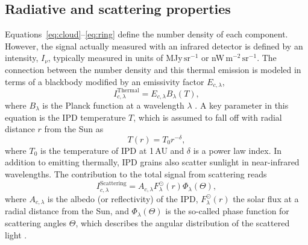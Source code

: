\documentclass[twocolumn]{aa}
\begin{document}
\subsection{Radiative and scattering properties}
Equations~\eqref{eq:cloud}--\eqref{eq:ring} define the number density
of each component. However, the signal actually measured with an
infrared detector is defined by an intensity, $I_{\nu}$, typically
measured in units of MJy$\,\mathrm{sr}^{-1}$ or
nW$\,\mathrm{m}^{-2}\,\mathrm{sr}^{-1}$. The connection between the
number density and this thermal emission is modeled in terms
of a blackbody modified by an emissivity factor $E_{c, \lambda}$,
\begin{equation}
    I^\mathrm{Thermal}_{c,\lambda} = E_{c,\lambda} B_\lambda(T),
\end{equation}
where $B_\lambda$ is the Planck function at a wavelength $\lambda$
\citep{Kelsall1998}. A key parameter in this equation is the IPD
temperature $T$, which is assumed to fall off with radial distance $r$
from the Sun as
\begin{equation}
    T(r) = T_0 r^{-\delta},
\end{equation}
where $T_0$ is the temperature of IPD at 1\,AU and $\delta$ is a power
law index. In addition to emitting thermally, IPD grains also scatter
sunlight in near-infrared wavelengths. The contribution to the total
signal from scattering reads
\begin{equation}\label{eq: scat_term}
    I^\mathrm{Scattering}_{c, \lambda} = A_{c, \lambda} F_\lambda^\odot(r) \Phi_\lambda(\Theta),
\end{equation}
where $A_{c, \lambda}$ is the albedo (or reflectivity) of the IPD,
$F_\lambda^\odot(r)$ the solar flux at a radial distance from the Sun,
and $\Phi_\lambda(\Theta)$ is the so-called phase function for scattering angles
$\Theta$, which describes the angular distribution of the scattered
light \citep{Kelsall1998}.
\end{document}
